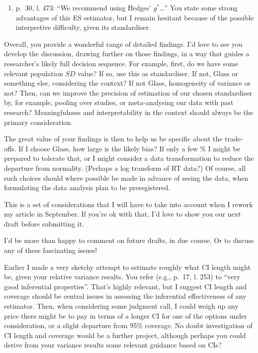 \documentclass[
  12pt,
  french,
]{article}
\providecommand{\tightlist}{%
  \setlength{\itemsep}{0pt}\setlength{\parskip}{0pt}}
\begin{document}
\color{black}

\begin{enumerate}
\def\labelenumi{\arabic{enumi}.}
\setcounter{enumi}{1}
\tightlist
\item
  p.~30, l. 473: ``We recommend using Hedges' \(g^*\)\ldots{}'' You
  state some strong advantages of this ES estimator, but I remain
  hesitant because of the possible interpretive difficulty, given its
  standardiser.
\end{enumerate}

Overall, you provide a wonderful range of detailed findings. I'd love to
see you develop the discussion, drawing further on those findings, in a
way that guides a researcher's likely full decision sequence. For
example, first, do we have some relevant population \(SD\) value? If so,
use this as standardiser. If not, Glass or something else, considering
the context? If not Glass, homogeneity of variance or not? Then, can we
improve the precision of estimation of our chosen standardiser by, for
example, pooling over studies, or meta-analysing our data with past
research? Meaningfulness and interpretability in the context should
always be the primary consideration.

The great value of your findings is then to help us be specific about
the trade-offs. If I choose Glass, how large is the likely bias? If only
a few \(\%\) I might be prepared to tolerate that, or I might consider a
data transformation to reduce the departure from normality. (Perhaps a
log transform of RT data?) Of course, all such choices should where
possible be made in advance of seeing the data, when formulating the
data analysis plan to be preregistered.

\color{blue} This is a set of considerations that I will have to take
into account when I rework my article in September. If you're ok with
that, I'd love to show you our next draft before submitting it.

\color{brown} I'd be more than happy to comment on future drafts, in due
course. Or to discuss any of these fascinating issues!

\color{black} Earlier I made a very sketchy attempt to estimate roughly
what CI length might be, given your relative variance results. You refer
(e.g., p.~17, l. 253) to ``very good inferential properties''. That's
highly relevant, but I suggest CI length and coverage should be central
issues in assessing the inferential effectiveness of any estimator.
Then, when considering some judgment call, I could weigh up any price
there might be to pay in terms of a longer CI for one of the options
under consideration, or a slight departure from 95\(\%\) coverage. No
doubt investigation of CI length and coverage would be a further
project, although perhaps you could derive from your variance results
some relevant guidance based on CIs?
\end{document}
